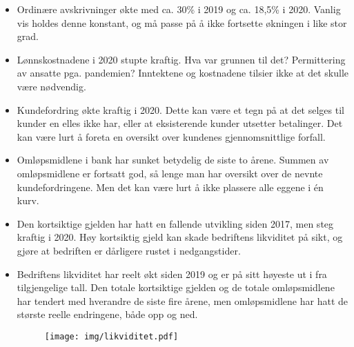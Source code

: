 \documentclass[a4paper, 12pt]{article}  %
\begin{document}
\begin{itemize}
  \item Ordinære avskrivninger økte med ca. 30\% i 2019 og ca. 18,5\% i 2020. Vanlig vis holdes denne konstant, og må passe på å ikke fortsette økningen i like stor grad.
  
  \item Lønnskostnadene i 2020 stupte kraftig. Hva var grunnen til det? Permittering av ansatte pga. pandemien? Inntektene og kostnadene tilsier ikke at det skulle være nødvendig.
  
  \item Kundefordring økte kraftig i 2020. Dette kan være et tegn på at det selges til kunder en elles ikke har, eller at eksisterende kunder utsetter betalinger. Det kan være lurt å foreta en oversikt over kundenes gjennomsnittlige forfall. 
  
  \item Omløpsmidlene i bank har sunket betydelig de siste to årene. Summen av omløpsmidlene er fortsatt god, så lenge man har oversikt over de nevnte kundefordringene. Men det kan være lurt å ikke plassere alle eggene i én kurv.
  
  \item Den kortsiktige gjelden har hatt en fallende utvikling siden 2017, men steg kraftig i 2020. Høy kortsiktig gjeld kan skade bedriftens likviditet på sikt, og gjøre at bedriften er dårligere rustet i nedgangstider.
  
  \item Bedriftens likviditet har reelt økt siden 2019 og er på sitt høyeste ut i fra tilgjengelige tall. Den totale kortsiktige gjelden og de totale omløpsmidlene har tendert med hverandre de siste fire årene, men omløpsmidlene har hatt de største reelle endringene, både opp og ned.
  \begin{figure}[H]
    \centering
    \texttt{[image: img/likviditet.pdf]}
  \end{figure}
\end{itemize}

\newpage
\printbibliography[heading=bibintoc] %
\end{document}
